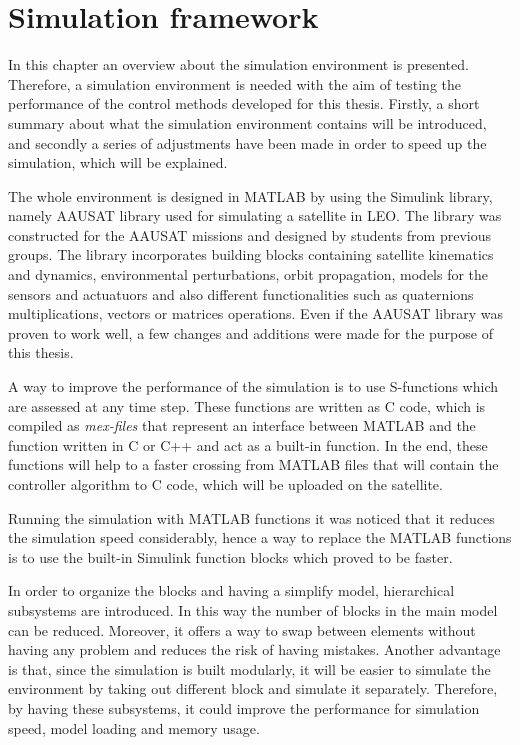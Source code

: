 \chapter{Simulation framework} \label{chap:G}
In this chapter an overview about the simulation environment is presented. Therefore, a simulation environment is needed with the aim of testing the performance of the control methods developed for this thesis. Firstly, a short summary about what the simulation environment contains will be introduced, and secondly a series of adjustments have been made in order to speed up the simulation, which will be explained.

The whole environment is designed in MATLAB by using the Simulink library, namely AAUSAT library used for simulating a satellite in LEO. The library was constructed for the AAUSAT missions and designed by students from previous groups. The library incorporates building blocks containing satellite kinematics and dynamics, environmental perturbations, orbit propagation, models for the sensors and actuatuors and also different functionalities such as quaternions multiplications, vectors or matrices operations. Even if the AAUSAT library was proven to work well, a few changes and additions were made for the purpose of this thesis.

A way to improve the performance of the simulation is to use S-functions which are assessed at any time step. These functions are written as C code, which is compiled as \textit{mex-files} that represent an interface between MATLAB and the function written in C or C++ and act as a built-in function. In the end, these functions will help to a faster crossing from MATLAB files that will contain the controller algorithm to C code, which will be uploaded on the satellite.

Running the simulation with MATLAB functions it was noticed that it reduces the simulation speed considerably, hence a way to replace the MATLAB functions is to use the built-in Simulink function blocks which proved to be faster. 

In order to organize the blocks and having a simplify model, hierarchical subsystems are introduced. In this way the number of blocks in the main model  can be reduced. Moreover, it offers a way to swap between elements without having any problem and reduces the risk of having mistakes. Another advantage is that, since the simulation is built modularly, it will be easier to simulate the environment by taking out different block and simulate it separately. Therefore, by having these subsystems, it could improve the performance for simulation speed, model loading and memory usage.

